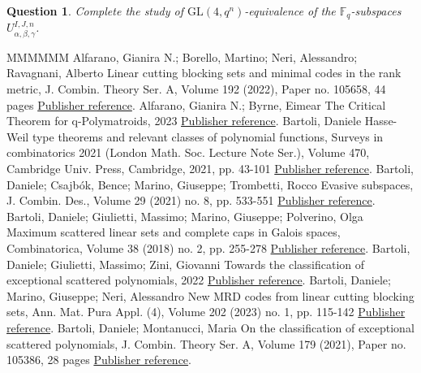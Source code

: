 \documentclass[11pt]{article}
\newtheorem{ques}[theo]{Question}
\theoremstyle{definition}
\numberwithin{equation}{section}
\begin{document}
\begin{ques}
 Complete the study of $\textrm{GL}(4,q^n)$-equivalence of the  $\mathbb{F}_q$-subspaces~$U_{\alpha, \beta, \gamma}^{I,J,n}$.
\end{ques}
\begin{thebibliography}{MMMMMM}
 Alfarano, Gianira N.; Borello, Martino; Neri, Alessandro; Ravagnani, Alberto Linear cutting blocking sets and minimal codes in the rank metric, J. Combin. Theory Ser. A, Volume 192 (2022), Paper no. 105658, 44 pages \href{https://alco.centre-mersenne.org/articles/10.5802/alco.377/#ABNR22}{Publisher reference}.
 Alfarano, Gianira N.; Byrne, Eimear The Critical Theorem for q-Polymatroids, 2023 \href{https://alco.centre-mersenne.org/articles/10.5802/alco.377/#alfarano2023critical}{Publisher reference}.
 Bartoli, Daniele Hasse-Weil type theorems and relevant classes of polynomial functions, Surveys in combinatorics 2021 (London Math. Soc. Lecture Note Ser.), Volume 470, Cambridge Univ. Press, Cambridge, 2021, pp. 43-101 \href{https://alco.centre-mersenne.org/articles/10.5802/alco.377/#Bartoli:2020aa4}{Publisher reference}.
 Bartoli, Daniele; Csajbók, Bence; Marino, Giuseppe; Trombetti, Rocco Evasive subspaces, J. Combin. Des., Volume 29 (2021) no. 8, pp. 533-551 \href{https://alco.centre-mersenne.org/articles/10.5802/alco.377/#bartoli2021evasive}{Publisher reference}.
 Bartoli, Daniele; Giulietti, Massimo; Marino, Giuseppe; Polverino, Olga Maximum scattered linear sets and complete caps in Galois spaces, Combinatorica, Volume 38 (2018) no. 2, pp. 255-278 \href{https://alco.centre-mersenne.org/articles/10.5802/alco.377/#BGMP}{Publisher reference}.
 Bartoli, Daniele; Giulietti, Massimo; Zini, Giovanni Towards the classification of exceptional scattered polynomials, 2022 \href{https://alco.centre-mersenne.org/articles/10.5802/alco.377/#bartoli2022towards}{Publisher reference}.
 Bartoli, Daniele; Marino, Giuseppe; Neri, Alessandro New MRD codes from linear cutting blocking sets, Ann. Mat. Pura Appl. (4), Volume 202 (2023) no. 1, pp. 115-142 \href{https://alco.centre-mersenne.org/articles/10.5802/alco.377/#BMN2022}{Publisher reference}.
 Bartoli, Daniele; Montanucci, Maria On the classification of exceptional scattered polynomials, J. Combin. Theory Ser. A, Volume 179 (2021), Paper no. 105386, 28 pages \href{https://alco.centre-mersenne.org/articles/10.5802/alco.377/#MR4190573}{Publisher reference}.

\end{thebibliography}
\end{document}
